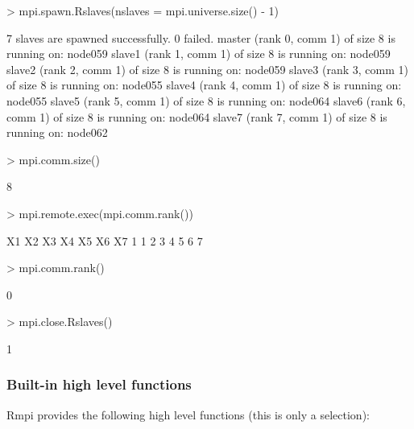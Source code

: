 \begin{Schunk}
\begin{Sinput}
> mpi.spawn.Rslaves(nslaves = mpi.universe.size() - 1)
\end{Sinput}
\begin{Soutput}
	7 slaves are spawned successfully. 0 failed.
master (rank 0, comm 1) of size 8 is running on: node059 
slave1 (rank 1, comm 1) of size 8 is running on: node059 
slave2 (rank 2, comm 1) of size 8 is running on: node059 
slave3 (rank 3, comm 1) of size 8 is running on: node055 
slave4 (rank 4, comm 1) of size 8 is running on: node055 
slave5 (rank 5, comm 1) of size 8 is running on: node064 
slave6 (rank 6, comm 1) of size 8 is running on: node064 
slave7 (rank 7, comm 1) of size 8 is running on: node062 
\end{Soutput}
\begin{Sinput}
> mpi.comm.size()
\end{Sinput}
\begin{Soutput}
[1] 8
\end{Soutput}
\begin{Sinput}
> mpi.remote.exec(mpi.comm.rank())
\end{Sinput}
\begin{Soutput}
  X1 X2 X3 X4 X5 X6 X7
1  1  2  3  4  5  6  7
\end{Soutput}
\begin{Sinput}
> mpi.comm.rank()
\end{Sinput}
\begin{Soutput}
[1] 0
\end{Soutput}
\begin{Sinput}
> mpi.close.Rslaves()
\end{Sinput}
\begin{Soutput}
[1] 1
\end{Soutput}
\end{Schunk}

\subsubsection{Built-in high level functions}

Rmpi provides the following high level functions (this is only a selection): 

